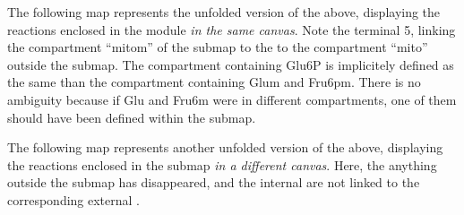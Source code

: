 The following map represents the unfolded version of the above, displaying the reactions enclosed in the module \emph{in the same canvas}. Note the terminal 5, linking the compartment ``mitom'' of the submap to the to the compartment ``mito'' outside the submap. The compartment containing Glu6P is implicitely defined as the same than the compartment containing Glum and Fru6pm. There is no ambiguity because if Glu and Fru6m were in different compartments, one of them should have been defined within the submap.

\begin{center}
\end{center}

The following map represents another unfolded version of the above, displaying the reactions enclosed in the submap \emph{in a different canvas}. Here, the anything outside the submap has disappeared, and the internal  are not linked to the corresponding external .

\begin{center}
\end{center}
\normalcolor

